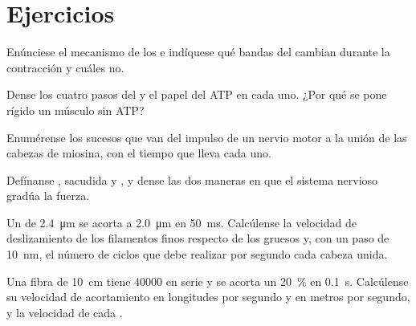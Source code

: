 \section{Ejercicios}

\begin{exercise}[$\star$]\label{exo:b2:muscle-movement:1}
Enúnciese el mecanismo de los  e indíquese qué
bandas del  cambian durante la contracción y cuáles no.
\end{exercise}

\begin{exercise}[$\star$]\label{exo:b2:muscle-movement:2}
Dense los cuatro pasos del  y el papel del
ATP en cada uno. ¿Por qué se pone rígido un músculo sin ATP?
\end{exercise}

\begin{exercise}[$\star$]\label{exo:b2:muscle-movement:3}
Enumérense los sucesos que van del impulso de un nervio motor a la unión de
las cabezas de miosina, con el tiempo que lleva cada uno.
\end{exercise}

\begin{exercise}[$\star$]\label{exo:b2:muscle-movement:4}
Defínanse , sacudida y , y dense las dos maneras en
que el sistema nervioso gradúa la fuerza.
\end{exercise}

\begin{exercise}[$\star\star$]\label{exo:b2:muscle-movement:5}
Un  de \qty{2.4}{\micro m} se acorta a \qty{2.0}{\micro m} en
\qty{50}{ms}. Calcúlense la velocidad de deslizamiento de los filamentos
finos respecto de los gruesos y, con un paso de \qty{10}{nm}, el número de
ciclos que debe realizar por segundo cada cabeza unida.
\end{exercise}

\begin{exercise}[$\star\star$]\label{exo:b2:muscle-movement:6}
Una fibra de \qty{10}{cm} tiene \num{40000}  en serie y se acorta
un \qty{20}{\%} en \qty{0.1}{s}. Calcúlense su velocidad de acortamiento en
longitudes por segundo y en metros por segundo, y la velocidad de cada
.
\end{exercise}

